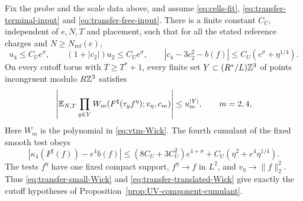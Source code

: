 \begin{proposition}\label{prop:transfer-UV-inputs}
Fix the probe and the scale data above, and assume
\eqref{eq:cells-fit}, \eqref{eq:transfer-terminal-input} and \eqref{eq:transfer-free-input}.
There is a finite
constant $C_U$, independent of $e,N,T$ and placement,
such that for all the stated reference charges and
$N\ge N_{\mathrm{ref}}(e)$,
\begin{equation}\label{eq:transfer-small-Wick}
 u_4\le C_Ue^\sigma,\qquad
 (1+|c_2|)u_2\le C_Ue^\sigma,\qquad
 |c_4-3c_2^2-b(f)|\le C_U(e^\sigma+\eta^{1/4}).
\end{equation}
On every cutoff torus with $T\ge T^*+1$, every finite
set $Y\subset(R^*/L)\mathbb Z^3$ of points incongruent
modulo $R\mathbb Z^3$ satisfies
\begin{equation}\label{eq:transfer-translated-Wick}
 \left|\mathbb E_{N,T}\prod_{y\in Y}
       W_m(F^\sharp(\tau_yf^\eta);v_\eta,c_m)\right|
                          \le u_m^{|Y|},\qquad m=2,4,
\end{equation}
Here $W_m$ is the polynomial in \eqref{eq:vtm-Wick}.
The fourth cumulant of the fixed smooth test obeys
\begin{equation}\label{eq:transfer-smooth-cumulant}
 |\kappa_4(F^\sharp(f))-e^4b(f)|
 \le(8C_U+3C_U^2)e^{4+\sigma}
                  +C_U(\eta^2+e^4\eta^{1/4}).
\end{equation}
The tests $f^\eta$ have one fixed compact support,
$f^\eta\to f$ in $L^2$, and $v_\eta\to\|f\|_2^2$.
Thus \eqref{eq:transfer-small-Wick} and
\eqref{eq:transfer-translated-Wick} give exactly the
cutoff hypotheses of Proposition~\ref{prop:UV-component-cumulant}.
\end{proposition}

